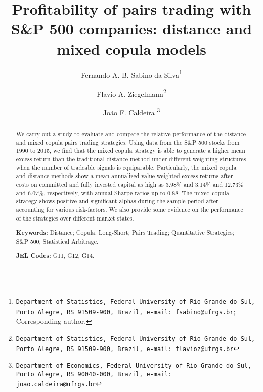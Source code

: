 \documentclass[a4paper]{article}
\begin{document}
	
	
	\makeatletter
	\def\@maketitle{%
		\newpage
		\null
		\vskip 2em%
		\begin{center}%
			\let \footnote \thanks
			{\Large\bfseries \@title \par}%
			\vskip 1.5em%
			{\normalsize
				\lineskip .5em%
				\begin{tabular}[t]{c}%
					\@author
				\end{tabular}\par}%
			\vskip 1em%
			{\normalsize \@date}%
		\end{center}%
		\par
		\vskip 1.5em}
	\makeatother
	
	\title{Profitability of pairs trading with S\&P 500 companies: distance and mixed copula models}
	\author[]{ Fernando A. B. Sabino da Silva\thanks{\texttt{Department of Statistics, Federal University of Rio Grande do Sul, Porto Alegre, RS 91509-900, Brazil, e-mail: fsabino@ufrgs.br}; Corresponding author.}}
	\author[]{Flavio A. Ziegelmann\thanks{\texttt{Department of Statistics, Federal University of Rio Grande do Sul, Porto Alegre, RS 91509-900, Brazil, e-mail: flavioz@ufrgs.br}}}
	\author[]{João F. Caldeira \thanks{\texttt{Department of Economics, Federal University of Rio Grande do Sul, Porto Alegre, RS 90040-000, Brazil, e-mail: joao.caldeira@ufrgs.br}}}
	\affil[]{}
	\date{}
	\maketitle
	
	
	\begin{abstract}
		We carry out a study to evaluate and compare the relative performance of the distance and mixed copula pairs trading strategies. Using data from the S\&P 500 stocks from 1990 to 2015, we find that the mixed copula strategy is able to generate a higher mean excess return than the traditional distance method under different weighting structures when the number of tradeable signals is equiparable. Particularly, the mixed copula and distance methods show a mean annualized value-weighted excess returns after costs on committed and fully invested capital as high as 3.98\% and 3.14\% and 12.73\% and 6.07\%, respectively, with annual Sharpe ratios up to 0.88. The mixed copula strategy shows positive and significant alphas during the sample period after accounting for various risk-factors. We also provide some evidence on the performance of the strategies over different market states. 
		
		\smallskip
		
		\noindent \textbf{Keywords:} Distance; Copula; Long-Short; Pairs Trading; Quantitative Strategies; S\&P 500; Statistical Arbitrage.
		
		\noindent \textbf{JEL Codes:} G11, G12, G14.
	\end{abstract}
	
\end{document}

